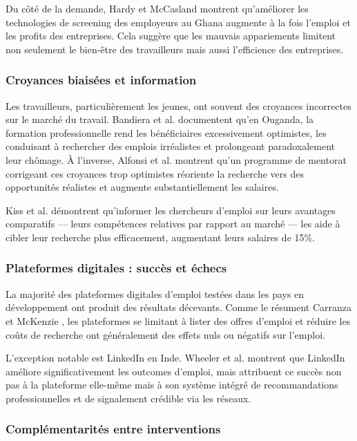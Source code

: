 \documentclass[12pt]{article}
\begin{document}
Du côté de la demande, Hardy et McCasland \citeyearpar{hardy2023} montrent qu'améliorer les technologies de screening des employeurs au Ghana augmente à la fois l'emploi et les profits des entreprises. Cela suggère que les mauvais appariements limitent non seulement le bien-être des travailleurs mais aussi l'efficience des entreprises.

\subsubsection{Croyances biaisées et information}

Les travailleurs, particulièrement les jeunes, ont souvent des croyances incorrectes sur le marché du travail. Bandiera et al. \citeyearpar{bandiera2023} documentent qu'en Ouganda, la formation professionnelle rend les bénéficiaires excessivement optimistes, les conduisant à rechercher des emplois irréalistes et prolongeant paradoxalement leur chômage. À l'inverse, Alfonsi et al. \citeyearpar{alfonsi2022} montrent qu'un programme de mentorat corrigeant ces croyances trop optimistes réoriente la recherche vers des opportunités réalistes et augmente substantiellement les salaires.

Kiss et al. \citeyearpar{kiss2023} démontrent qu'informer les chercheurs d'emploi sur leurs avantages comparatifs — leurs compétences relatives par rapport au marché — les aide à cibler leur recherche plus efficacement, augmentant leurs salaires de 15\%.

\subsubsection{Plateformes digitales : succès et échecs}

La majorité des plateformes digitales d'emploi testées dans les pays en développement ont produit des résultats décevants. Comme le résument Carranza et McKenzie \citeyearpar{carranza2024}, les plateformes se limitant à lister des offres d'emploi et réduire les coûts de recherche ont généralement des effets nuls ou négatifs sur l'emploi.

L'exception notable est LinkedIn en Inde. Wheeler et al. \citeyearpar{wheeler2022} montrent que LinkedIn améliore significativement les outcomes d'emploi, mais attribuent ce succès non pas à la plateforme elle-même mais à son système intégré de recommandations professionnelles et de signalement crédible via les réseaux.

\subsubsection{Complémentarités entre interventions}
\end{document}
